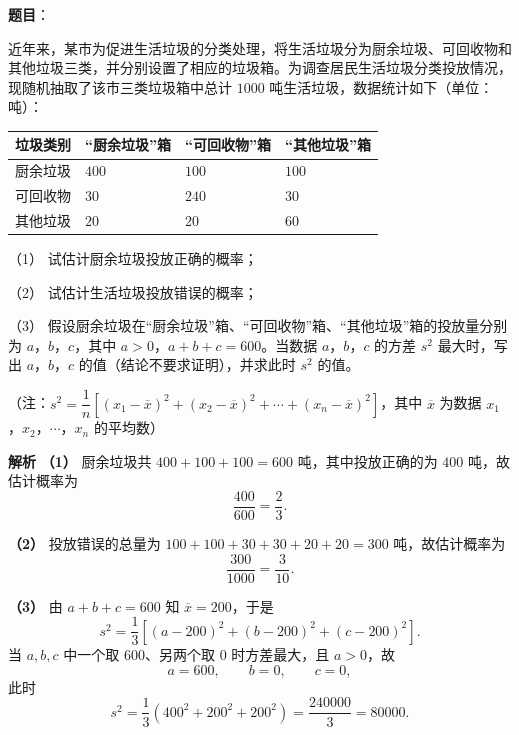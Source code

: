 \begin{answer}

\textbf{题目}：

近年来，某市为促进生活垃圾的分类处理，将生活垃圾分为厨余垃圾、可回收物和其他垃圾三类，并分别设置了相应的垃圾箱。为调查居民生活垃圾分类投放情况，现随机抽取了该市三类垃圾箱中总计 $1000$ 吨生活垃圾，数据统计如下（单位：吨）：

\begin{center}
\begin{tabular}{llll}
\toprule
垃圾类别 & “厨余垃圾”箱 & “可回收物”箱 & “其他垃圾”箱 \\
\midrule
厨余垃圾 & $400$ & $100$ & $100$ \\
可回收物 & $30$ & $240$ & $30$ \\
其他垃圾 & $20$ & $20$ & $60$ \\
\bottomrule
\end{tabular}
\end{center}

（1） 试估计厨余垃圾投放正确的概率；

（2） 试估计生活垃圾投放错误的概率；

（3） 假设厨余垃圾在“厨余垃圾”箱、“可回收物”箱、“其他垃圾”箱的投放量分别为 $a$，$b$，$c$，其中 $a>0$，$a+b+c=600$。当数据 $a$，$b$，$c$ 的方差 $s^2$ 最大时，写出 $a$，$b$，$c$ 的值（结论不要求证明），并求此时 $s^2$ 的值。

（注：$s^2=\dfrac1n\left[(x_1-\overline x)^2+(x_2-\overline x)^2+\cdots+(x_n-\overline x)^2\right]$，其中 $\overline x$ 为数据 $x_1$，$x_2$，$\cdots$，$x_n$ 的平均数）

\textbf{解析}
\textbf{（1）} 厨余垃圾共 $400+100+100=600$ 吨，其中投放正确的为 $400$ 吨，故估计概率为
\nopagebreak[4]
\[\frac{400}{600}=\frac23.\]

\textbf{（2）} 投放错误的总量为 $100+100+30+30+20+20=300$ 吨，故估计概率为
\nopagebreak[4]
\[\frac{300}{1000}=\frac3{10}.\]

\textbf{（3）} 由 $a+b+c=600$ 知 $\overline x=200$，于是
\nopagebreak[4]
\[s^2=\frac13\left[(a-200)^2+(b-200)^2+(c-200)^2\right].\]
当 $a,b,c$ 中一个取 $600$、另两个取 $0$ 时方差最大，且 $a>0$，故
\nopagebreak[4]
\[a=600,\qquad b=0,\qquad c=0,\]
此时
\nopagebreak[4]
\[s^2=\frac13\left(400^2+200^2+200^2\right)=\frac{240000}3=80000.\]




\end{answer}

